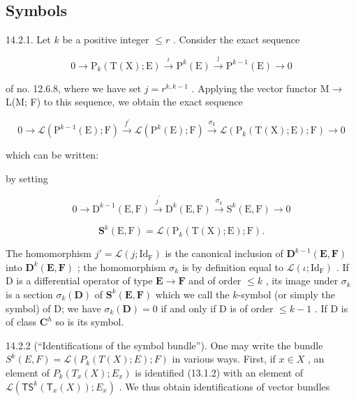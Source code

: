 \subsection{Symbols}

14.2.1. Let \(k\) be a positive integer \(\leqslant r\) . Consider the exact sequence

\[
0 \rightarrow \mathrm{P} _ {k} (\mathrm{T} (\mathrm{X}); \mathrm{E}) \xrightarrow {\iota} \mathrm{P} ^ {k} (\mathrm{E}) \xrightarrow {\jmath} \mathrm{P} ^ {k - 1} (\mathrm{E}) \rightarrow 0
\]

of no. 12.6.8, where we have set \(j = r^{k, k-1}\) . Applying the vector functor M → L(M; F) to this sequence, we obtain the exact sequence

\[
0 \rightarrow \mathscr {L} (\mathrm{P} ^ {k - 1} (\mathrm{E}); \mathrm{F}) \xrightarrow {f ^ {\prime}} \mathscr {L} (\mathrm{P} ^ {k} (\mathrm{E}); \mathrm{F}) \xrightarrow {\sigma_ {k}} \mathscr {L} (\mathrm{P} _ {k} (\mathrm{T} (\mathrm{X}); \mathrm{E}); \mathrm{F}) \rightarrow 0
\]

which can be written:

by setting

\[
0 \rightarrow \mathrm{D} ^ {k - 1} (\mathrm{E}, \mathrm{F}) \xrightarrow {j ^ {\prime}} \mathrm{D} ^ {k} (\mathrm{E}, \mathrm{F}) \xrightarrow {\sigma_ {k}} \mathrm{S} ^ {k} (\mathrm{E}, \mathrm{F}) \rightarrow 0
\]

\[
\mathbf {S} ^ {k} (\mathrm{E}, \mathrm{F}) = \mathcal {L} (\mathrm{P} _ {k} (\mathrm{T} (\mathrm{X}); \mathrm{E}); \mathrm{F}).
\]

The homomorphism \(j' = \mathcal{L}(j; \mathrm{Id}_{\mathrm{F}})\) is the canonical inclusion of \(\mathbf{D}^{k-1}(\mathbf{E}, \mathbf{F})\) into \(\mathbf{D}^k(\mathbf{E}, \mathbf{F})\) ; the homomorphism \(\sigma_k\) is by definition equal to \(\mathcal{L}(\iota; \mathrm{Id}_{\mathrm{F}})\) . If D is a differential operator of type \(\mathbf{E} \to \mathbf{F}\) and of order \(\leqslant k\) , its image under \(\sigma_k\) is a section \(\sigma_k(\mathbf{D})\) of \(\mathbf{S}^k(\mathbf{E}, \mathbf{F})\) which we call the \(k\)-symbol (or simply the symbol) of D; we have \(\sigma_k(\mathbf{D}) = 0\) if and only if D is of order \(\leqslant k - 1\) . If D is of class \(\mathbf{C}^h\) so is its symbol.

14.2.2 (“Identifications of the symbol bundle”). One may write the bundle \(S^{k}(E, F) = \mathcal{L}(P_{k}(T(X); E); F)\) in various ways. First, if \(x \in X\) , an element of \(P_{k}(T_{x}(X); E_{x})\) is identified (13.1.2) with an element of \(\mathcal{L}(\mathsf{T}\mathsf{S}^{k}(\mathsf{T}_{x}(X)); E_{x})\) . We thus obtain identifications of vector bundles

